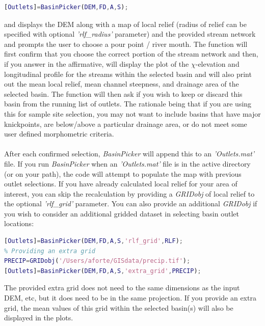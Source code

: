 \begin{lstlisting}[language=Matlab]
[Outlets]=BasinPicker(DEM,FD,A,S);
\end{lstlisting}

\noindent
 and displays the DEM along with a map of local relief (radius of relief can be specified with optional \textit{'rlf\_radius'} parameter) and the provided stream network and prompts the user to choose a pour point / river mouth. The function will first confirm that you choose the correct portion of the stream network and then, if you answer in the affirmative, will display the plot of the $\chi$-elevation and longitudinal profile for the streams within the selected basin and will also print out the mean local relief, mean channel steepness, and drainage area of the selected basin. The function will then ask if you wish to keep or discard this basin from the running list of outlets. The rationale being that if you are using this for sample site selection, you may not want to include basins that have major knickpoints, are below/above a particular drainage area, or do not meet some user defined morphometric criteria. 

\paragraph{}After each confirmed selection, \textit{BasinPicker} will append this to an \textit{'Outlets.mat'} file. If you run \textit{BasinPicker} when an \textit{'Outlets.mat'} file is in the active directory (or on your path), the code will attempt to populate the map with previous outlet selections. If you have already calculated local relief for your area of interest, you can skip the recalculation by providing a \textit{GRIDobj} of local relief to the optional \textit{'rlf\_grid'} parameter. You can also provide an additional \textit{GRIDobj} if you wish to consider an additional gridded dataset in selecting basin outlet locations:

\begin{lstlisting}[language=Matlab]
% Providing a precomputed relief grid
[Outlets]=BasinPicker(DEM,FD,A,S,'rlf_grid',RLF);
% Providing an extra grid
PRECIP=GRIDobj('/Users/aforte/GISdata/precip.tif');
[Outlets]=BasinPicker(DEM,FD,A,S,'extra_grid',PRECIP);
\end{lstlisting}

\noindent
The provided extra grid does not need to the same dimensions as the input DEM, etc, but it does need to be in the same projection. If you provide an extra grid, the mean values of this grid within the selected basin(s) will also be displayed in the plots. 

